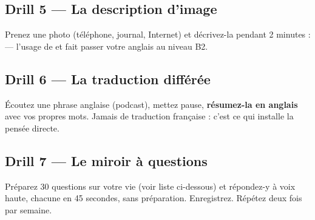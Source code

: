 \subsection{Drill 5 --- La description d'image}
Prenez une photo (téléphone, journal, Internet) et décrivez-la pendant 2 minutes :
 --- l'usage de  et  fait passer votre
anglais au niveau B2.

\subsection{Drill 6 --- La traduction différée}
Écoutez une phrase anglaise (podcast), mettez pause, \textbf{résumez-la en anglais} avec vos
propres mots. Jamais de traduction française : c'est ce qui installe la pensée directe.

\subsection{Drill 7 --- Le miroir à questions}
Préparez 30 questions sur votre vie (voir liste ci-dessous) et répondez-y à voix haute,
chacune en 45 secondes, sans préparation. Enregistrez. Répétez deux fois par semaine.

